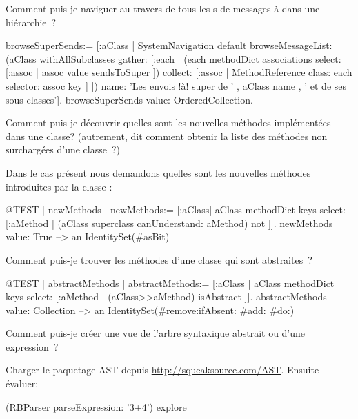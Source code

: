 \documentclass[a4paper,10pt,twoside]{book}
\begin{document}
\begin{faq}
Comment puis-je naviguer au travers de tous les 
s de messages à \super dans une hiérarchie~?
\end{faq}
\answer
\begin{code}{}
browseSuperSends:= [:aClass | SystemNavigation default
	browseMessageList: (aClass withAllSubclasses gather: [:each |
		(each methodDict associations
			select: [:assoc | assoc value sendsToSuper ])
				collect: [:assoc | MethodReference class: each selector: assoc key ] ])
	name: 'Les envois !à! super de ' , aClass name , ' et de ses sous-classes'].
browseSuperSends value: OrderedCollection.
\end{code}

\begin{faq}
Comment puis-je découvrir quelles sont les nouvelles méthodes implémentées dans une classe? (autrement, dit comment obtenir la liste des méthodes non surchargées d'une classe~?) 
\end{faq}
\answer
Dans le cas présent nous demandons quelles sont les nouvelles méthodes introduites par la classe :
\begin{code}{@TEST | newMethods |}
newMethods:= [:aClass| aClass methodDict keys select:
	[:aMethod | (aClass superclass canUnderstand: aMethod) not ]].
newMethods value: True --> an IdentitySet(#asBit)
\end{code}

\begin{faq}
Comment puis-je trouver les méthodes d'une classe qui sont abstraites~?
\end{faq}
\answer
\begin{code}{@TEST | abstractMethods |}
abstractMethods:=
	[:aClass | aClass methodDict keys select:
		[:aMethod | (aClass>>aMethod) isAbstract ]].
abstractMethods value: Collection --> an IdentitySet(#remove:ifAbsent: #add: #do:)
\end{code}

\begin{faq}
Comment puis-je créer une vue de l'arbre syntaxique abstrait ou 
 d'une expression~?
\end{faq}
\answer
Charger le paquetage AST depuis \url{http://squeaksource.com/AST}. Ensuite évaluer:
\begin{code}{}
(RBParser parseExpression: '3+4') explore
\end{code}
\end{document}
